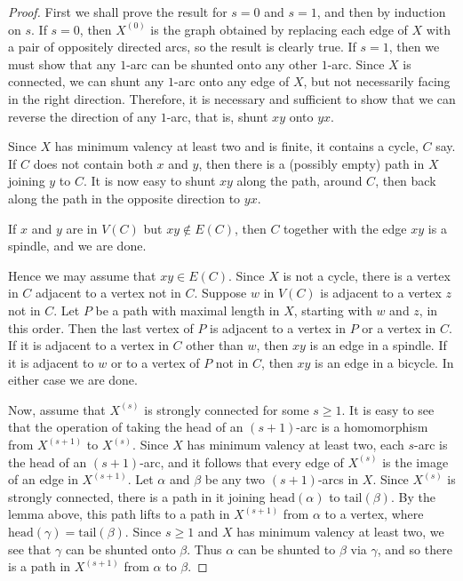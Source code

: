 \documentclass[12pt,a4paper,openany]{book}
\begin{document}
\begin{proof}
First we shall prove the result for $s = 0$ and $s = 1$, and then by induction on $s$. If $s = 0$, then $X^{(0)}$ is the graph obtained by replacing each edge of $X$ with a pair of oppositely directed arcs, so the result is clearly true. If $s = 1$, then we must show that any $1$-arc can be shunted onto any other $1$-arc. Since $X$ is connected, we can shunt any $1$-arc onto any edge of $X$, but not necessarily facing in the right direction. Therefore, it is necessary and sufficient to show that we can reverse the direction of any $1$-arc, that is, shunt $xy$ onto $yx$.

Since $X$ has minimum valency at least two and is finite, it contains a cycle, $C$ say. If $C$ does not contain both $x$ and $y$, then there is a (possibly empty) path in $X$ joining $y$ to $C$. It is now easy to shunt $xy$ along the path, around $C$, then back along the path in the opposite direction to $yx$.

If $x$ and $y$ are in $V(C)$ but $xy \notin E(C)$, then $C$ together with the edge $xy$ is a spindle, and we are done.

Hence we may assume that $xy \in E(C)$. Since $X$ is not a cycle, there is a vertex in $C$ adjacent to a vertex not in $C$. Suppose $w$ in $V(C)$ is adjacent to a vertex $z$ not in $C$. Let $P$ be a path with maximal length in $X$, starting with $w$ and $z$, in this order. Then the last vertex of $P$ is adjacent to a vertex in $P$ or a vertex in $C$. If it is adjacent to a vertex in $C$ other than $w$, then $xy$ is an edge in a spindle. If it is adjacent to $w$ or to a vertex of $P$ not in $C$, then $xy$ is an edge in a bicycle. In either case we are done.

Now, assume that $X^{(s)}$ is strongly connected for some $s \geq 1$. It is easy to see that the operation of taking the head of an $(s + 1)$-arc is a homomorphism from $X^{(s+1)}$ to $X^{(s)}$. Since $X$ has minimum valency at least two, each $s$-arc is the head of an $(s + 1)$-arc, and it follows that every edge of $X^{(s)}$ is the image of an edge in $X^{(s+1)}$. Let $\alpha$ and $\beta$ be any two $(s+1)$-arcs in $X$. Since $X^{(s)}$ is strongly connected, there is a path in it joining $\text{head}(\alpha)$ to $\text{tail}(\beta)$. By the lemma above, this path lifts to a path in $X^{(s+1)}$ from $\alpha$ to a vertex, where $\text{head}(\gamma) = \text{tail}(\beta)$. Since $s \geq 1$ and $X$ has minimum valency at least two, we see that $\gamma$ can be shunted onto $\beta$. Thus $\alpha$ can be shunted to $\beta$ via $\gamma$, and so there is a path in $X^{(s+1)}$ from $\alpha$ to $\beta$.
\end{proof}
\end{document}
